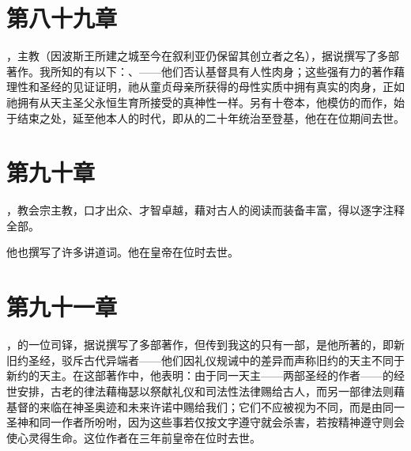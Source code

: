 
\section{第八十九章}

，主教（因波斯王所建之城至今在叙利亚仍保留其创立者之名），据说撰写了多部著作。我所知的有以下：、——他们否认基督具有人性肉身；这些强有力的著作藉理性和圣经的见证证明，祂从童贞母亲所获得的母性实质中拥有真实的肉身，正如祂拥有从天主圣父永恒生育所接受的真神性一样。另有十卷本，他模仿的而作，始于结束之处，延至他本人的时代，即从的二十年统治至登基，他在在位期间去世。\par


\section{第九十章}

，教会宗主教，口才出众、才智卓越，藉对古人的阅读而装备丰富，得以逐字注释全部。\par

他也撰写了许多讲道词。他在皇帝在位时去世。\par


\section{第九十一章}

，的一位司铎，据说撰写了多部著作，但传到我这的只有一部，是他所著的，即新旧约圣经，驳斥古代异端者——他们因礼仪规诫中的差异而声称旧约的天主不同于新约的天主。在这部著作中，他表明：由于同一天主——两部圣经的作者——的经世安排，古老的律法藉梅瑟以祭献礼仪和司法性法律赐给古人，而另一部律法则藉基督的来临在神圣奥迹和未来许诺中赐给我们；它们不应被视为不同，而是由同一圣神和同一作者所吩咐，因为这些事若仅按文字遵守就会杀害，若按精神遵守则会使心灵得生命。这位作者在三年前皇帝在位时去世。\par

